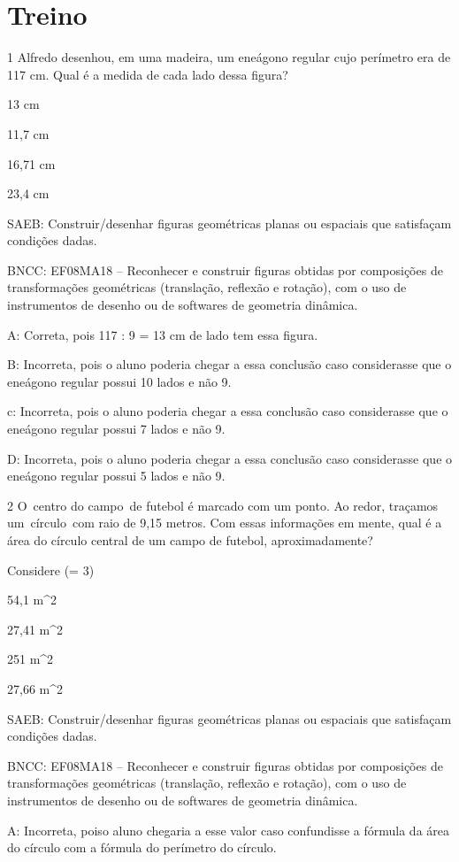 {\section{Treino}

\num{1} Alfredo desenhou, em uma madeira, um eneágono regular cujo perímetro
era de 117 cm. Qual é a medida de cada lado dessa figura?
\item 13 cm
\item 11,7 cm
\item 16,71 cm
\item 23,4 cm

SAEB: Construir/desenhar figuras geométricas planas ou espaciais que
satisfaçam condições dadas.

BNCC: EF08MA18 -- Reconhecer e construir figuras obtidas por composições
de transformações geométricas (translação, reflexão e rotação), com o
uso de instrumentos de desenho ou de softwares de geometria dinâmica.

A: Correta, pois 117 : 9 = 13 cm de lado tem essa figura.

B: Incorreta, pois o aluno poderia chegar a essa conclusão caso
considerasse que o eneágono regular possui 10 lados e não 9.

c: Incorreta, pois o aluno poderia chegar a essa conclusão caso
considerasse que o eneágono regular possui 7 lados e não 9.

D: Incorreta, pois o aluno poderia chegar a essa conclusão caso
considerasse que o eneágono regular possui 5 lados e não 9.

\num{2} O~centro do campo~de futebol é marcado com um ponto. Ao redor,
traçamos um~círculo~com raio de 9,15 metros. Com essas informações em
mente, qual é a área do círculo central de um campo de futebol,
aproximadamente?

Considere (\pi = 3)
\item 54,1 m^2
\item 27,41 m^2
\item 251 m^2
\item 27,66 m^2

SAEB: Construir/desenhar figuras geométricas planas ou espaciais que
satisfaçam condições dadas.

BNCC: EF08MA18 -- Reconhecer e construir figuras obtidas por composições
de transformações geométricas (translação, reflexão e rotação), com o
uso de instrumentos de desenho ou de softwares de geometria dinâmica.

A: Incorreta, poiso aluno chegaria a esse valor caso confundisse a
fórmula da área do círculo com a fórmula do perímetro do círculo.

}

